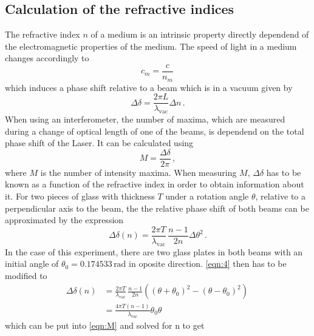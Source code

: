 \subsection{Calculation of the refractive indices}
The refractive index $n$ of a medium is an intrinsic property directly dependend of the electromagnetic properties of the medium. The speed of light in a medium changes accordingly to 
\begin{equation}
    c_m = \frac{c}{n_m} \, 
\end{equation}
which induces a phase shift relative to a beam which is in a vacuum given by 
\begin{equation}
    \label{eqn:deldel}
    \Delta \delta = \frac{2\pi L}{\lambda_{\text{vac}}} \Delta n \, .
\end{equation}
When using an interferometer, the number of maxima, which are measured during a change of optical length of one of the beams, is dependend on the total phase shift of the Laser.
It can be calculated using 
\begin{equation}
    \label{eqn:M}
    M = \frac{\Delta \delta}{2 \pi} \, ,
\end{equation}
where $M$ is the number of intensity maxima.
When measuring $M$, $\Delta \delta$ has to be known as a function of the refractive index in order to obtain information about it. For two pieces of glass with thickness $T$ under a rotation angle $\theta$, relative to a perpendicular axis to the beam, the the relative phase shift of both beams can be approximated by the expression
\begin{equation}
    \label{eqn:4}
    \Delta \delta \left( n \right) = \frac{2 \pi T}{\lambda_\text{vac}}  \, \frac{n-1}{2n}\Delta \theta^2 \, .
\end{equation}
In the case of this experiment, there are two glass plates in both beams with an initial angle of $\theta_0 = 0.174533 \, \text{rad}$ in oposite direction. 
\autoref{eqn:4} then has to be modified to 
\begin{equation}
    \begin{aligned}
    \label{eqn:5}
    \Delta \delta \left( n \right) &= \frac{2 \pi T}{\lambda_\text{vac}} \, \frac{n-1}{2n} \left( \left(\theta + \theta_0\right)^2 - \left(\theta - \theta_0\right)^2 \right) \, \\
    &= \frac{4 \pi T \left(n-1\right)}{\lambda_\text{vac}} \theta_0 \theta
    \end{aligned}
\end{equation}
which can be put into \autoref{eqn:M} and solved for n to get 

